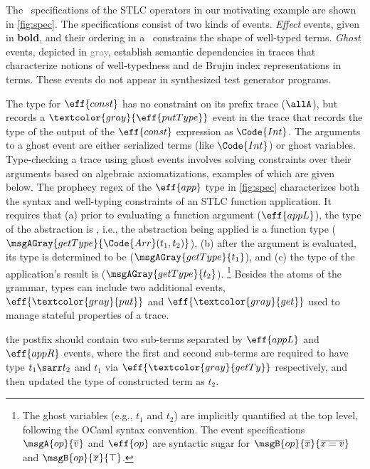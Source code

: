 The \tyName\ specifications of the STLC operators in our motivating
example are shown in \autoref{fig:spec}.  The specifications consist
of two kinds of events.  \emph{Effect} events, given in
\textbf{bold}, and their ordering in a \tyName\ constrains
the shape of well-typed terms.  \emph{Ghost} events, depicted in
\textcolor{gray}{gray}, establish semantic dependencies in traces that
characterize notions of well-typedness and de Brujin index
representations in terms.  These events do not appear in synthesized
test generator programs.


The type for $\eff{const}$ has no constraint on its prefix trace
($\allA$), but records a $\textcolor{gray}{\eff{putType}}$ event in
the trace that records the type of the output of the $\eff{const}$
expression as $\Code{Int}$.  The arguments to a ghost event are either
serialized terms (like $\Code{Int}$) or ghost variables.
Type-checking a trace using ghost events involves solving constraints
over their arguments based on algebraic axiomatizations, examples of
which are given below.  The prophecy regex of the $\eff{app}$ type in
\autoref{fig:spec} characterizes both the syntax and well-typing
constraints of an STLC function application. It requires that (a)
prior to evaluating a function argument ($\eff{appL}$), the type of
the abstraction is , i.e., the abstraction
being applied is a function type ($\msgAGray{getType}{\Code{Arr}(t_1,t_2)}$), (b) after the argument is evaluated, its type is
  determined to be  ($\msgAGray{getType}{t_1}$), and (c)
  the type of the application's result is 
  ($\msgAGray{getType}{t_2}$).  
\footnote{The ghost variables
  (e.g., $t_1$ and $t_2$) are implicitly quantified at the top level,
  following the OCaml syntax convention. The event specifications
  $\msgA{op}{\overline{v}}$ and $\eff{op}$ are syntactic sugar for
  $\msgB{op}{\overline{x}}{\overline{x = v}}$ and
  $\msgB{op}{\overline{x}}{\top}$.}  Besides the atoms of the grammar,
types can include two additional events, $\eff{\textcolor{gray}{put}}$
and $\eff{\textcolor{gray}{get}}$ used to manage stateful properties
of a trace.

the postfix should contain two sub-terms separated by
$\eff{appL}$ and $\eff{appR}$ events, where the first and second
sub-terms are required to have type $t_1\sarr t_2$ and $t_1$ via
$\eff{\textcolor{gray}{getTy}}$ respectively, and then updated the
type of constructed term as $t_2$.


